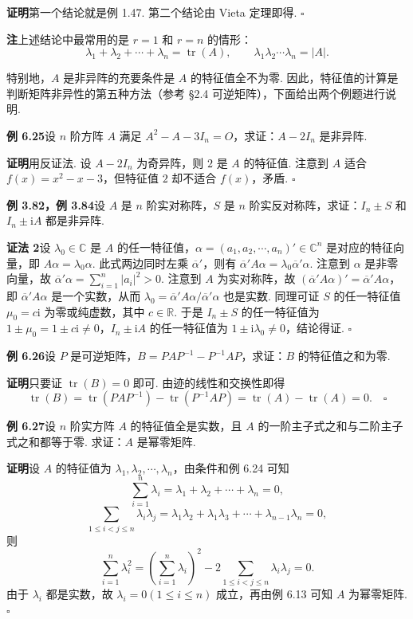 \documentclass[UTF8,12pt,a4paper,fontset=fandol]{ctexart}
\begin{document}
\noindent\textbf{证明}\quad 第一个结论就是例 1.47. 第二个结论由 Vieta 定理即得. $\square$

\noindent\textbf{注}\quad 上述结论中最常用的是 $r=1$ 和 $r=n$ 的情形：
\[
\lambda_1+\lambda_2+\cdots+\lambda_n=\operatorname{tr}(A),\qquad
\lambda_1\lambda_2\cdots\lambda_n=|A|.
\]

特别地，$A$ 是非异阵的充要条件是 $A$ 的特征值全不为零. 因此，特征值的计算是判断矩阵非异性的第五种方法（参考 §2.4 可逆矩阵），下面给出两个例题进行说明.

\noindent\textbf{例 6.25}\quad 设 $n$ 阶方阵 $A$ 满足 $A^2-A-3I_n=O$，求证：$A-2I_n$ 是非异阵.

\noindent\textbf{证明}\quad 用反证法. 设 $A-2I_n$ 为奇异阵，则 $2$ 是 $A$ 的特征值. 注意到 $A$ 适合 $f(x)=x^2-x-3$，但特征值 $2$ 却不适合 $f(x)$，矛盾. $\square$

\noindent\textbf{例 3.82，例 3.84}\quad 设 $A$ 是 $n$ 阶实对称阵，$S$ 是 $n$ 阶实反对称阵，求证：$I_n\pm S$ 和 $I_n\pm \mathrm{i}A$ 都是非异阵.

\noindent\textbf{证法 2}\quad 设 $\lambda_0\in\mathbb{C}$ 是 $A$ 的任一特征值，$\alpha=(a_1,a_2,\cdots,a_n)'\in\mathbb{C}^n$ 是对应的特征向量，即 $A\alpha=\lambda_0\alpha$. 此式两边同时左乘 $\overline{\alpha}'$，则有 $\overline{\alpha}'A\alpha=\lambda_0\overline{\alpha}'\alpha$. 注意到 $\alpha$ 是非零向量，故 $\overline{\alpha}'\alpha=\sum_{i=1}^n|a_i|^2>0$. 注意到 $A$ 为实对称阵，故 $(\overline{\alpha}'A\alpha)'=\overline{\alpha}'A\alpha$，即 $\overline{\alpha}'A\alpha$ 是一个实数，从而 $\lambda_0=\overline{\alpha}'A\alpha/\overline{\alpha}'\alpha$ 也是实数. 同理可证 $S$ 的任一特征值 $\mu_0=c\mathrm{i}$ 为零或纯虚数，其中 $c\in\mathbb{R}$. 于是 $I_n\pm S$ 的任一特征值为 $1\pm \mu_0=1\pm c\mathrm{i}\ne 0$，$I_n\pm \mathrm{i}A$ 的任一特征值为 $1\pm \mathrm{i}\lambda_0\ne 0$，结论得证. $\square$

\noindent\textbf{例 6.26}\quad 设 $P$ 是可逆矩阵，$B=PAP^{-1}-P^{-1}AP$，求证：$B$ 的特征值之和为零.

\noindent\textbf{证明}\quad 只要证 $\operatorname{tr}(B)=0$ 即可. 由迹的线性和交换性即得
\[
\operatorname{tr}(B)=\operatorname{tr}(PAP^{-1})-\operatorname{tr}(P^{-1}AP)
=\operatorname{tr}(A)-\operatorname{tr}(A)=0. \quad \square
\]

\noindent\textbf{例 6.27}\quad 设 $n$ 阶实方阵 $A$ 的特征值全是实数，且 $A$ 的一阶主子式之和与二阶主子式之和都等于零. 求证：$A$ 是幂零矩阵.

\noindent\textbf{证明}\quad 设 $A$ 的特征值为 $\lambda_1,\lambda_2,\cdots,\lambda_n$，由条件和例 6.24 可知
\[
\sum_{i=1}^n\lambda_i=\lambda_1+\lambda_2+\cdots+\lambda_n=0,
\]
\[
\sum_{1\le i<j\le n}\lambda_i\lambda_j
=\lambda_1\lambda_2+\lambda_1\lambda_3+\cdots+\lambda_{n-1}\lambda_n=0,
\]
则
\[
\sum_{i=1}^n\lambda_i^2
=\left(\sum_{i=1}^n\lambda_i\right)^2
-2\sum_{1\le i<j\le n}\lambda_i\lambda_j=0.
\]
由于 $\lambda_i$ 都是实数，故 $\lambda_i=0(1\le i\le n)$ 成立，再由例 6.13 可知 $A$ 为幂零矩阵. $\square$
\end{document}
